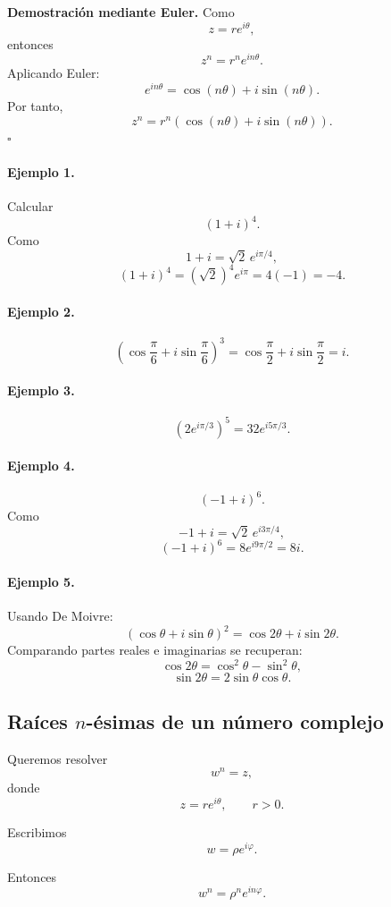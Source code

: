 \textbf{Demostración mediante Euler.}
Como
\[
z=re^{i\theta},
\]
entonces
\[
z^n
=
r^ne^{in\theta}.
\]
Aplicando Euler:
\[
e^{in\theta}
=
\cos(n\theta)+i\sin(n\theta).
\]
Por tanto,
\[
z^n
=
r^n
\left(
\cos(n\theta)+i\sin(n\theta)
\right).
\]
\hfill$\square$

\paragraph{Ejemplo 1.}
Calcular
\[
(1+i)^4.
\]
Como
\[
1+i=\sqrt2\,e^{i\pi/4},
\]
\[
(1+i)^4
=
(\sqrt2)^4e^{i\pi}
=
4(-1)
=
\boxed{-4}.
\]

\paragraph{Ejemplo 2.}
\[
\left(
\cos\frac{\pi}{6}
+i\sin\frac{\pi}{6}
\right)^3
=
\cos\frac{\pi}{2}
+i\sin\frac{\pi}{2}
=
i.
\]

\paragraph{Ejemplo 3.}
\[
(2e^{i\pi/3})^5
=
32e^{i5\pi/3}.
\]

\paragraph{Ejemplo 4.}
\[
(-1+i)^6.
\]
Como
\[
-1+i
=
\sqrt2\,e^{i3\pi/4},
\]
\[
(-1+i)^6
=
8e^{i9\pi/2}
=
8i.
\]

\paragraph{Ejemplo 5.}
Usando De Moivre:
\[
(\cos\theta+i\sin\theta)^2
=
\cos2\theta+i\sin2\theta.
\]
Comparando partes reales e imaginarias se recuperan:
\[
\cos2\theta=\cos^2\theta-\sin^2\theta,
\]
\[
\sin2\theta=2\sin\theta\cos\theta.
\]

\subsection{Raíces $n$-ésimas de un número complejo}

Queremos resolver
\[
w^n=z,
\]
donde
\[
z=re^{i\theta},
\qquad
r>0.
\]

Escribimos
\[
w=\rho e^{i\varphi}.
\]

Entonces
\[
w^n
=
\rho^ne^{in\varphi}.
\]

